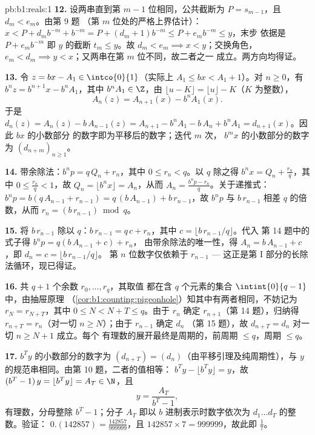 \begin{solution}{pb:b1:reals:1}
\textbf{12.} 设两串直到第 $m - 1$ 位相同，公共截断为
$P = s_{m-1}$，且 $d_m < e_m$。由第 9 题
（第 $m$ 位处的严格上界估计）：$x < P + d_m b^{-m} + b^{-m} = P +
(d_m + 1)b^{-m} \leq P + e_m b^{-m} \leq y$，末步
依据是 $P + e_m b^{-m}$ 即 $y$ 的截断 $t_m \leq y$。故
$d_m < e_m \implies x < y$；交换角色，$e_m < d_m \implies
y < x$；又两串在第 $m$ 位不同，故二者之一
成立。两方向均得证。

\textbf{13.} 令 $z = bx - A_1 \in \intco{0}{1}$（实际上 $A_1
\leq bx < A_1 + 1$）。对 $n \geq 0$，有 $b^n z = b^{n+1} x - b^n
A_1$，其中 $b^n A_1 \in \Z$，由 $\lfloor u - K \rfloor =
\lfloor u \rfloor - K$（$K$ 为整数），
\[
A_n(z) = A_{n+1}(x) - b^n A_1(x) .
\]
于是 $d_n(z) = A_n(z) - b\,A_{n-1}(z) = A_{n+1} - b^n A_1 -
b\,A_n + b^n A_1 = d_{n+1}(x)$。因此 $bx$ 的小数部分
的数字即为平移后的数字；迭代 $m$ 次，
$b^m x$ 的小数部分的数字为 $(d_{n+m})_{n \geq 1}$。

\textbf{14.} 带余除法：$b^n p = q\,Q_n + r_n$，其中 $0
\leq r_n < q$。以 $q$ 除之得 $b^n x = Q_n + \frac{r_n}{q}$，其中
$0 \leq \frac{r_n}{q} < 1$，故 $Q_n = \lfloor b^n x \rfloor =
A_n$，从而 $A_n = \frac{b^n p - r_n}{q}$。关于递推式：
$b^n p = b(q\,A_{n-1} + r_{n-1}) = q\,(b\,A_{n-1}) +
b\,r_{n-1}$，故 $b^n p$ 与 $b\,r_{n-1}$ 相差
$q$ 的倍数，从而 $r_n = (b\,r_{n-1}) \bmod q$。

\textbf{15.} 将 $b\,r_{n-1}$ 除以 $q$：$b\,r_{n-1} = q\,c +
r_n$，其中 $c = \lfloor b\,r_{n-1}/q \rfloor$。代入
第 14 题中的式子得 $b^n p = q(b\,A_{n-1} + c) + r_n$，
由带余除法的唯一性，得 $A_n = b\,A_{n-1}
+ c$，即 $d_n = c = \lfloor b\,r_{n-1}/q \rfloor$。
第 $n$ 位数字仅依赖于 $r_{n-1}$ --- 这正是第
I 部分的长除法循环，现已得证。

\textbf{16.} 共 $q + 1$ 个余数 $r_0, \dots, r_q$，其取值
都在含 $q$ 个元素的集合 $\intint{0}{q-1}$ 中，由抽屉原理
（\cref{cor:b1:counting:pigeonhole}）知其中有两者相同，不妨记为
$r_N = r_{N+T}$，其中 $0 \leq N < N + T \leq q$。由于 $r_n$
确定 $r_{n+1}$（第 14 题），归纳得 $r_{n+T} =
r_n$（对一切 $n \geq N$）；由于 $r_{n-1}$ 确定 $d_n$
（第 15 题），故 $d_{n+T} = d_n$ 对一切 $n \geq N + 1$ 成立。每个
有理数的展开最终是周期的，前周期 $\leq
q$，周期 $\leq q$。

\textbf{17.} $b^T y$ 的小数部分的数字为
$(d_{n+T}) = (d_n)$（由平移引理及纯周期性），与
$y$ 的规范串相同。由第 10 题，二者的值相等：
$b^T y - \lfloor b^T y \rfloor = y$，故 $(b^T - 1)\,y = \lfloor
b^T y \rfloor = A_T \in \N$，且
\[
y = \frac{A_T}{b^T - 1} ,
\]
有理数，分母整除 $b^T - 1$；分子 $A_T$
即以 $b$ 进制表示时数字依次为 $d_1 \dots d_T$ 的整数。验证：
$0.(142857) = \frac{142857}{999999}$，且 $142857 \times 7 =
999999$，故此即 $\frac 17$。


\end{solution}
